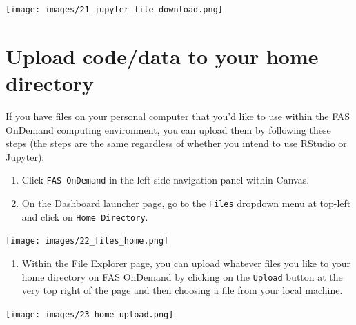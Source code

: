 \documentclass[]{book}
\providecommand{\tightlist}{%
  \setlength{\itemsep}{0pt}\setlength{\parskip}{0pt}}
\begin{document}
\texttt{[image: images/21\_jupyter\_file\_download.png]}

\hypertarget{upload-codedata-to-your-home-directory}{%
\chapter{Upload code/data to your home directory}\label{upload-codedata-to-your-home-directory}}

If you have files on your personal computer that you'd like to use within the FAS OnDemand computing environment, you can upload them by following these steps (the steps are the same regardless of whether you intend to use RStudio or Jupyter):

\begin{enumerate}
\def\labelenumi{\arabic{enumi}.}
\tightlist
\item
  Click \texttt{FAS\ OnDemand} in the left-side navigation panel within Canvas.
\item
  On the Dashboard launcher page, go to the \texttt{Files} dropdown menu at top-left and click on \texttt{Home\ Directory}.
\end{enumerate}

\texttt{[image: images/22\_files\_home.png]}

\begin{enumerate}
\def\labelenumi{\arabic{enumi}.}
\setcounter{enumi}{2}
\tightlist
\item
  Within the File Explorer page, you can upload whatever files you like to your home directory on FAS OnDemand by clicking on the \texttt{Upload} button at the very top right of the page and then choosing a file from your local machine.
\end{enumerate}

\texttt{[image: images/23\_home\_upload.png]}
\end{document}
